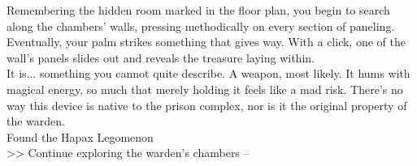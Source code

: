 Remembering the hidden room marked in the floor plan, you begin to search along the chambers' walls, pressing methodically on every section of paneling.\\

Eventually, your palm strikes something that gives way. With a click, one of the wall’s panels slides out and reveals the treasure laying within.\\

It is... something you cannot quite describe. A weapon, most likely. It hums with magical energy, so much that merely holding it feels like a mad risk. There’s no way this device is native to the prison complex, nor is it the original property of the warden.\\
 Found the Hapax Legomenon\\

>> Continue exploring the warden’s chambers -- 
